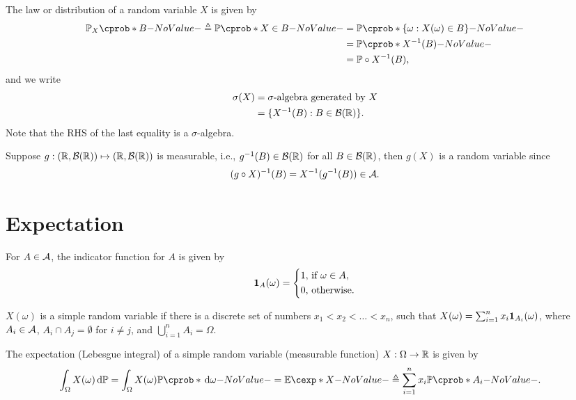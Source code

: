 \documentclass[12pt]{article}
\begin{document}
The law or distribution of a random variable $X$ is given by
\begin{align*}
\P_{X}(B)\triangleq \P(X\in B)
&= \P(\{\omega : X(\omega) \in B\}) \\
&= \P(X^{-1}(B)) \\
&= \P\circ X^{-1}(B),
\end{align*}
and we write
\begin{align*}
\sigma(X) 
&= \text{$\sigma$-algebra generated by $X$} \\
&= \{X^{-1}(B) : B \in \mathcal{B}(\mathbb{R})\}.
\end{align*}
Note that the RHS of the last equality is a $\sigma$-algebra.

Suppose $g:(\mathbb{R}, \mathcal{B}(\mathbb{R})) \mapsto (\mathbb{R}, \mathcal{B}(\mathbb{R}))$ is measurable, i.e., $g^{-1}(B)\in\mathcal{B}(\mathbb{R})$ for all $B\in\mathcal{B}(\mathbb{R})$, then $g(X)$ is a random variable since 
\begin{align*}
(g \circ X)^{-1}(B)=X^{-1}(g^{-1}(B))\in \mathcal{A}.
\end{align*}


\section{Expectation}\label{sec:Expectation}

For $A\in\mathcal{A}$, the indicator function for $A$ is given by 
\begin{align}
{\bf 1}_{A}(\omega)=\left\{
\begin{aligned}
1,\ &	 \text{if } \omega \in A, \\
0,\  & 	\text{otherwise}.
\end{aligned}
\right.
\end{align}

\begin{Definition}
$X(\omega)$ is a simple random variable if there is a discrete set of numbers $x_1<x_2< \ldots<x_n$, such that $X(\omega)= \sum_{i=1}^n{x_i} {\bf 1}_{A_i}(\omega)$, where $A_i\in\mathcal{A}$, $A_{i}\cap A_{j}= \emptyset$ for $i \neq j$, and $\bigcup_{i=1}^n{A_{i}} = \Omega$.
\end{Definition}


\begin{Definition}\label{wk4:def:expectation}
The expectation (Lebesgue integral) of a simple random variable (measurable function) $X: \Omega \to \mathbb{R}$ is given by
\begin{align*}
\int_{\Omega} X(\omega) \ud\P
& = \int_{\Omega} X(\omega) \P(\ud\omega) 
= \E[X] 
\triangleq \sum_{i=1}^n{x_i \P(A_i)}.
\end{align*}
\end{Definition}
\end{document}
